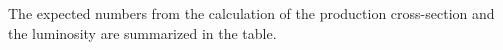 
The expected numbers from the calculation of the production cross-section and the luminosity are summarized in the table.

